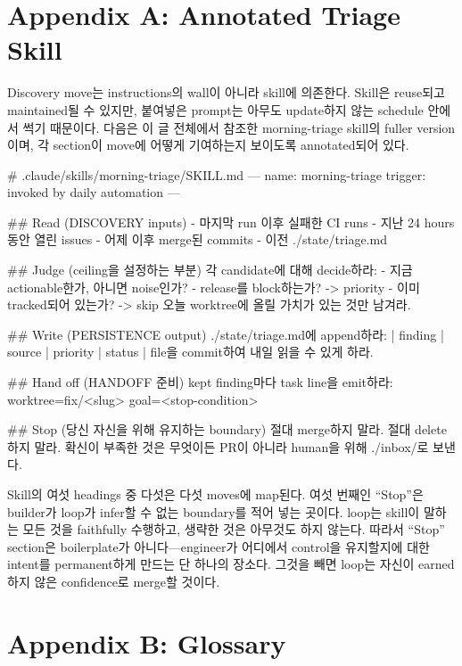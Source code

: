 \documentclass[conference]{IEEEtran}
\begin{document}
\section{Appendix A: Annotated Triage Skill}
Discovery move는 instructions의 wall이 아니라 skill에 의존한다. Skill은 reuse되고 maintained될 수 있지만, 붙여넣은 prompt는 아무도 update하지 않는 schedule 안에서 썩기 때문이다. 다음은 이 글 전체에서 참조한 morning-triage skill의 fuller version이며, 각 section이 move에 어떻게 기여하는지 보이도록 annotated되어 있다.

\begin{code}
# .claude/skills/morning-triage/SKILL.md
---
name: morning-triage
trigger: invoked by daily automation
---

## Read (DISCOVERY inputs)
- 마지막 run 이후 실패한 CI runs
- 지난 24 hours 동안 열린 issues
- 어제 이후 merge된 commits
- 이전 ./state/triage.md

## Judge (ceiling을 설정하는 부분)
각 candidate에 대해 decide하라:
- 지금 actionable한가, 아니면 noise인가?
- release를 block하는가?   -> priority
- 이미 tracked되어 있는가?  -> skip
오늘 worktree에 올릴 가치가 있는 것만 남겨라.

## Write (PERSISTENCE output)
./state/triage.md에 append하라:
| finding | source | priority | status |
file을 commit하여 내일 읽을 수 있게 하라.

## Hand off (HANDOFF 준비)
kept finding마다 task line을 emit하라:
worktree=fix/<slug>
goal=<stop-condition>

## Stop (당신 자신을 위해 유지하는 boundary)
절대 merge하지 말라. 절대 delete하지 말라.
확신이 부족한 것은 무엇이든 PR이 아니라
human을 위해 ./inbox/로 보낸다.
\end{code}

Skill의 여섯 headings 중 다섯은 다섯 moves에 map된다. 여섯 번째인 ``Stop''은 builder가 loop가 infer할 수 없는 boundary를 적어 넣는 곳이다. loop는 skill이 말하는 모든 것을 faithfully 수행하고, 생략한 것은 아무것도 하지 않는다. 따라서 ``Stop'' section은 boilerplate가 아니다---engineer가 어디에서 control을 유지할지에 대한 intent를 permanent하게 만드는 단 하나의 장소다. 그것을 빼면 loop는 자신이 earned하지 않은 confidence로 merge할 것이다.

\section{Appendix B: Glossary}
\end{document}
